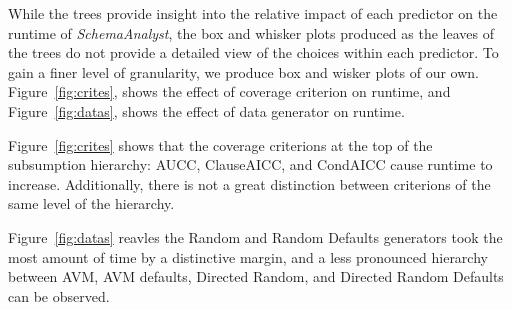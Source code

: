 

While the trees provide insight into the relative impact of each
predictor on the runtime of \textit{SchemaAnalyst}, the box and whisker
plots produced as the leaves of the trees do not provide a detailed view
of the choices within each predictor.  To gain a finer level of
granularity, we produce box and wisker plots of our own.
Figure~\ref{fig:crites}, shows the effect of coverage criterion on runtime, and Figure~\ref{fig:datas},
shows the effect of data generator on runtime.

Figure~\ref{fig:crites} shows that the coverage criterions at the top of the subsumption hierarchy: AUCC, ClauseAICC, and CondAICC cause runtime to
increase.  Additionally, there is not a great distinction between criterions of the same level of the hierarchy.

Figure~\ref{fig:datas} reavles the Random and Random Defaults generators took the most amount of time by a distinctive margin, and
a less pronounced hierarchy between AVM, AVM defaults, Directed Random, and Directed Random Defaults can be observed.
